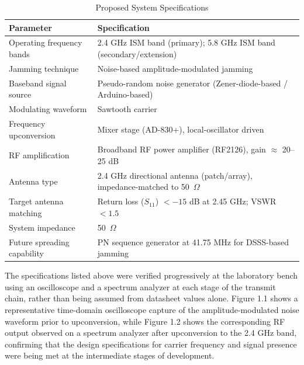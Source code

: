\documentclass[12pt,a4paper]{report}
\begin{document}
	\begin{table}[htbp]
		\centering
		\caption{Proposed System Specifications}
		\label{tab:system_specs}
		\renewcommand{\arraystretch}{1.3}
		\begin{tabularx}{\textwidth}{|l|X|}
			\hline
			\textbf{Parameter} & \textbf{Specification} \\ \hline
			
			Operating frequency bands &
			2.4 GHz ISM band (primary); 5.8 GHz ISM band (secondary/extension) \\ \hline
			
			Jamming technique &
			Noise-based amplitude-modulated jamming \\ \hline
			
			Baseband signal source &
			Pseudo-random noise generator (Zener-diode-based / Arduino-based) \\ \hline
			
			Modulating waveform &
			Sawtooth carrier \\ \hline
			
			Frequency upconversion &
			Mixer stage (AD-830+), local-oscillator driven \\ \hline
			
			RF amplification &
			Broadband RF power amplifier (RF2126), gain $\approx$ 20--25 dB \\ \hline
			
			Antenna type &
			2.4 GHz directional antenna (patch/array), impedance-matched to 50~$\Omega$ \\ \hline
			
			Target antenna matching &
			Return loss ($S_{11}$) $< -15$ dB at 2.45 GHz; VSWR $< 1.5$ \\ \hline
			
			System impedance &
			50~$\Omega$ \\ \hline
			
			Future spreading capability &
			PN sequence generator at 41.75 MHz for DSSS-based jamming \\ \hline
			
		\end{tabularx}
	\end{table}
	The specifications listed above were verified progressively at the laboratory bench using an oscilloscope and a spectrum analyzer at each stage of the transmit chain, rather than being assumed from datasheet values alone. Figure 1.1 shows a representative time-domain oscilloscope capture of the amplitude-modulated noise waveform prior to upconversion, while Figure 1.2 shows the corresponding RF output observed on a spectrum analyzer after upconversion to the 2.4 GHz band, confirming that the design specifications for carrier frequency and signal presence were being met at the intermediate stages of development.
	\vspace{0.5cm}
	
\end{document}

